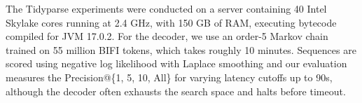 \documentclass[runningheads]{llncs}
\begin{document}
The Tidyparse experiments were conducted on a server containing 40 Intel Skylake cores running at 2.4 GHz, with 150 GB of RAM, executing bytecode compiled for JVM 17.0.2. For the decoder, we use an order-5 Markov chain trained on 55 million BIFI tokens, which takes roughly 10 minutes. Sequences are scored using negative log likelihood with Laplace smoothing and our evaluation measures the Precision@\{1, 5, 10, All\} for varying latency cutoffs up to 90s, although the decoder often exhausts the search space and halts before timeout.


\end{document}
